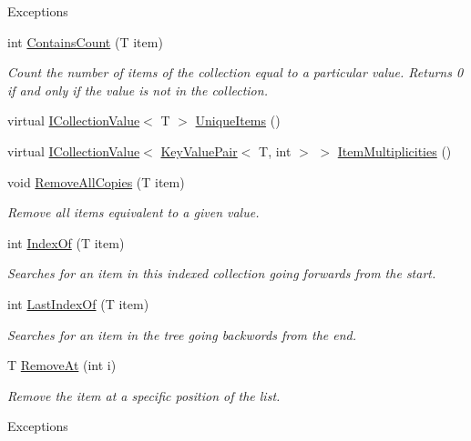 \begin{DoxyCompactItemize}
\begin{DoxyCompactList}
\begin{DoxyExceptions}{Exceptions}
\hline
\end{DoxyExceptions}
\end{DoxyCompactList}\item 
int \hyperlink{class_c5_1_1_tree_set_ab2df8bca715b6d3d24263e42dd4df84d}{Contains\+Count} (T item)
\begin{DoxyCompactList}\small\item\em Count the number of items of the collection equal to a particular value. Returns 0 if and only if the value is not in the collection. \end{DoxyCompactList}\item 
virtual \hyperlink{interface_c5_1_1_i_collection_value}{I\+Collection\+Value}$<$ T $>$ \hyperlink{class_c5_1_1_tree_set_a02a32bc9594d519364d9c611c9d48b1d}{Unique\+Items} ()
\item 
virtual \hyperlink{interface_c5_1_1_i_collection_value}{I\+Collection\+Value}$<$ \hyperlink{struct_c5_1_1_key_value_pair}{Key\+Value\+Pair}$<$ T, int $>$ $>$ \hyperlink{class_c5_1_1_tree_set_a34003354cd733efb85aa9bf871b2cd71}{Item\+Multiplicities} ()
\item 
void \hyperlink{class_c5_1_1_tree_set_a6ffcb62b0139bd09d755103b26ea4c9b}{Remove\+All\+Copies} (T item)
\begin{DoxyCompactList}\small\item\em Remove all items equivalent to a given value. \end{DoxyCompactList}\item 
int \hyperlink{class_c5_1_1_tree_set_a9a7af62e8459c31c03f984e84851ffb9}{Index\+Of} (T item)
\begin{DoxyCompactList}\small\item\em Searches for an item in this indexed collection going forwards from the start. \end{DoxyCompactList}\item 
int \hyperlink{class_c5_1_1_tree_set_a099dbba4e62506b221780172c30e84ce}{Last\+Index\+Of} (T item)
\begin{DoxyCompactList}\small\item\em Searches for an item in the tree going backwords from the end. \end{DoxyCompactList}\item 
T \hyperlink{class_c5_1_1_tree_set_aa12a3942109e24ea3ebbf22238af8f78}{Remove\+At} (int i)
\begin{DoxyCompactList}\small\item\em Remove the item at a specific position of the list. 
\begin{DoxyExceptions}{Exceptions}

\end{DoxyExceptions}
\end{DoxyCompactList}
\end{DoxyCompactItemize}
